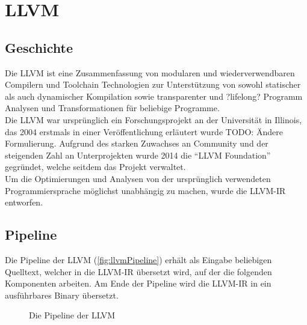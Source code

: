 \chapter{LLVM}
\section{Geschichte \cite{LLVMResearchBeginning}}
Die \ac{LLVM} ist eine Zusammenfassung von modularen und wiederverwendbaren Compilern und Toolchain Technologien zur Unterstützung von sowohl statischer als auch dynamischer Kompilation sowie transparenter und ?lifelong? Programm Analysen und Transformationen für beliebige Programme. \cite{LLVMWebsite}\\
Die \ac{LLVM} war ursprünglich ein Forschungsprojekt an der Universität in Illinois, das 2004 erstmals in einer Veröffentlichung erläutert wurde TODO: Ändere Formulierung.
Aufgrund des starken Zuwachses an Community und der steigenden Zahl an Unterprojekten wurde 2014 die \enquote{\ac{LLVM} Foundation} gegründet, welche seitdem das Projekt verwaltet. \cite{LLVMFoundation}\\
Um die Optimierungen und Analysen von der ursprünglich verwendeten Programmiersprache möglichst unabhängig zu machen, wurde die \ac{LLVM-IR} entworfen.

\section{Pipeline \cite{IntroLLVM}}
Die Pipeline der \ac{LLVM} (\autoref{fig:llvmPipeline}) erhält als Eingabe beliebigen Quelltext, welcher in die \ac{LLVM-IR} übersetzt wird, auf der die folgenden Komponenten arbeiten.
Am Ende der Pipeline wird die \ac{LLVM-IR} in ein ausführbares Binary übersetzt.
\begin{figure}[!ht]
    \caption{Die Pipeline der \ac{LLVM}}
    \label{fig:llvmPipeline}
    \centering
\end{figure}\\

